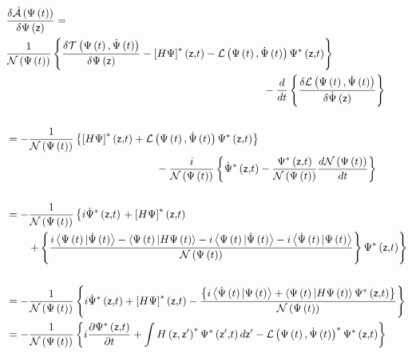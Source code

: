 \documentclass[aps,preprint]{revtex4}
\begin{document}
\begin{align}
& \frac{\delta\mathcal{\dot{A}}\left( \Psi\left( t\right) \right) }{%
\delta\Psi\left( \mathsf{z}\right) }=  \notag \\
& \frac{1}{\mathcal{N}\left( \Psi\left( t\right) \right) }\left\{ \frac{%
\delta\mathcal{T}\left( \Psi\left( t\right) ,\dot{\Psi}\left( t\right)
\right) }{\delta\Psi\left( \mathsf{z}\right) }-\left[ H\Psi\right]
^{\ast}\left( \mathsf{z,}t\right) -\mathcal{L}\left( \Psi\left( t\right) ,%
\dot{\Psi}\left( t\right) \right) \Psi^{\ast}\left( \mathsf{z,}t\right)
\right\}  \notag \\
& \qquad\qquad\qquad\qquad\qquad\qquad\qquad\qquad\qquad\qquad\qquad \qquad-%
\frac{d}{dt}\left\{ \frac{\delta\mathcal{L}\left( \Psi\left( t\right) ,\dot{%
\Psi}\left( t\right) \right) }{\delta\dot{\Psi}\left( \mathsf{z}\right) }%
\right\}  \notag \\
&  \notag \\
& =-\frac{1}{\mathcal{N}\left( \Psi\left( t\right) \right) }\left\{ \left[
H\Psi\right] ^{\ast}\left( \mathsf{z,}t\right) +\mathcal{L}\left( \Psi\left(
t\right) ,\dot{\Psi}\left( t\right) \right) \Psi^{\ast}\left( \mathsf{z,}%
t\right) \right\}  \notag \\
& \qquad\qquad\qquad\qquad\qquad\qquad\qquad-\frac{i}{\mathcal{N}\left(
\Psi\left( t\right) \right) }\left\{ \dot{\Psi}^{\ast}\left( \mathsf{z,}%
t\right) -\frac{\Psi^{\ast}\left( \mathsf{z,}t\right) }{\mathcal{N}\left(
\Psi\left( t\right) \right) }\frac{d\mathcal{N}\left( \Psi\left( t\right)
\right) }{dt}\right\}  \notag \\
&  \notag \\
& =-\frac{1}{\mathcal{N}\left( \Psi\left( t\right) \right) }\left\{ i\dot{%
\Psi}^{\ast}\left( \mathsf{z,}t\right) \right. +\left[ H\Psi\right]
^{\ast}\left( \mathsf{z,}t\right)  \notag \\
& \qquad\left. +\left\{ \frac{i\left\langle \Psi\left( t\right) |\dot {\Psi}%
\left( t\right) \right\rangle -\left\langle \Psi\left( t\right) |H\Psi\left(
t\right) \right\rangle -i\left\langle \Psi\left( t\right) |\dot{\Psi}\left(
t\right) \right\rangle -i\left\langle \dot{\Psi}\left( t\right) |\Psi\left(
t\right) \right\rangle }{\mathcal{N}\left( \Psi\left( t\right) \right) }%
\right\} \Psi^{\ast}\left( \mathsf{z,}t\right) \right\}  \notag \\
&  \notag \\
& =-\frac{1}{\mathcal{N}\left( \Psi\left( t\right) \right) }\left\{ i\dot{%
\Psi}^{\ast}\left( \mathsf{z,}t\right) +\left[ H\Psi\right] ^{\ast }\left( 
\mathsf{z,}t\right) -\frac{\left\{ i\left\langle \dot{\Psi}\left( t\right)
|\Psi\left( t\right) \right\rangle +\left\langle \Psi\left( t\right)
|H\Psi\left( t\right) \right\rangle \Psi^{\ast}\left( \mathsf{z,}t\right)
\right\} }{\mathcal{N}\left( \Psi\left( t\right) \right) }\right\}  \notag \\
& =-\frac{1}{\mathcal{N}\left( \Psi\left( t\right) \right) }\left\{ i\frac{%
\partial\Psi^{\ast}\left( \mathsf{z,}t\right) }{\partial t}+\int H\left( 
\mathsf{z,z}^{\prime}\right) ^{\ast}\Psi^{\ast}\left( \mathsf{z}^{\prime}%
\mathsf{,}t\right) d\mathsf{z}^{\prime}-\mathcal{L}\left( \Psi\left(
t\right) ,\dot{\Psi}\left( t\right) \right) ^{\ast}\Psi^{\ast }\left( 
\mathsf{z,}t\right) \right\}
\end{align}
\end{document}
